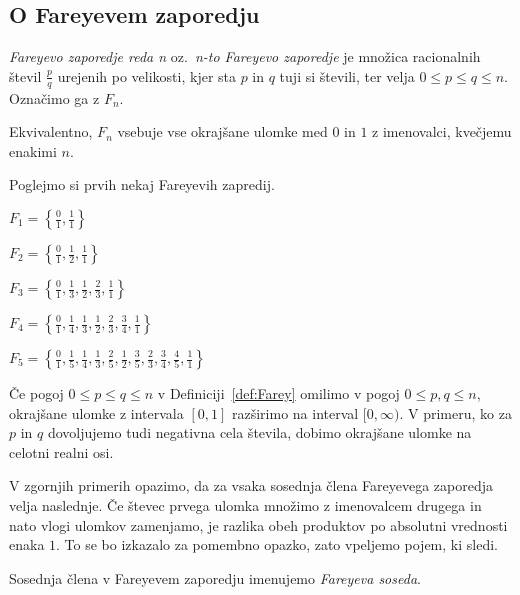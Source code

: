 \documentclass[mat1]{fmfdelo}
\begin{document}
%
\subsection{O Fareyevem zaporedju}

\begin{definicija}
\label{def:Farey}
\emph{Fareyevo zaporedje reda n} oz.\ \emph{n-to Fareyevo zaporedje} je množica racionalnih števil $\frac{p}{q}$ urejenih po velikosti, kjer sta $p$ in $q$ tuji si števili, ter velja $0 \leq p \leq q \leq n$. Označimo ga z $F_n$.

Ekvivalentno, $F_n$ vsebuje vse okrajšane ulomke med $0$ in $1$ z imenovalci, kvečjemu enakimi $n$.
\end{definicija}

\begin{primer}
Poglejmo si prvih nekaj Fareyevih zapredij.

\(F_1 = \left \{\frac{0}{1}, \frac{1}{1} \right \} \)

\(F_2 = \left \{\frac{0}{1}, \frac{1}{2}, \frac{1}{1} \right \} \)

\(F_3 = \left \{\frac{0}{1}, \frac{1}{3}, \frac{1}{2}, \frac{2}{3}, \frac{1}{1} \right \} \)

\(F_4 = \left \{\frac{0}{1}, \frac{1}{4}, \frac{1}{3}, \frac{1}{2}, \frac{2}{3}, \frac{3}{4}, \frac{1}{1} \right \} \)

\(F_5 = \left \{\frac{0}{1}, \frac{1}{5}, \frac{1}{4}, \frac{1}{3}, \frac{2}{5}, \frac{1}{2}, \frac{3}{5}, \frac{2}{3}, \frac{3}{4}, \frac{4}{5}, \frac{1}{1}\right \} \)
\end{primer}

\begin{opomba}
Če pogoj $0 \leq p \leq q \leq n$ v Definiciji~\ref{def:Farey} omilimo v pogoj $0 \leq p,q \leq n$, okrajšane ulomke z intervala $[0,1]$ razširimo na interval $[0, \infty)$. V primeru, ko za $p$ in $q$ dovoljujemo tudi negativna cela števila, dobimo okrajšane ulomke na celotni realni osi.
\end{opomba}

V zgornjih primerih opazimo, da za vsaka sosednja člena Fareyevega zaporedja velja naslednje. Če števec prvega ulomka množimo z imenovalcem drugega in nato vlogi ulomkov zamenjamo, je razlika obeh produktov po absolutni vrednosti enaka $1$. To se bo izkazalo za pomembno opazko, zato vpeljemo pojem, ki sledi.

\begin{definicija}
Sosednja člena v Fareyevem zaporedju imenujemo \emph{Fareyeva soseda}.
\end{definicija}
\end{document}
